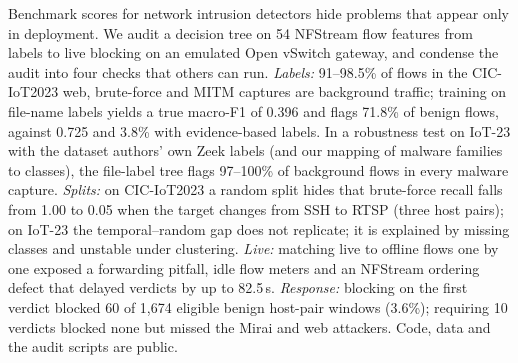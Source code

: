 Benchmark scores for network intrusion detectors hide problems that appear only in deployment. We audit a decision tree on 54 NFStream flow features from labels to live blocking on an emulated Open vSwitch gateway, and condense the audit into four checks that others can run. \emph{Labels:} 91--98.5\% of flows in the CIC-IoT2023 web, brute-force and MITM captures are background traffic; training on file-name labels yields a true macro-F1 of 0.396 and flags 71.8\% of benign flows, against 0.725 and 3.8\% with evidence-based labels. In a robustness test on IoT-23 with the dataset authors' own Zeek labels (and our mapping of malware families to classes), the file-label tree flags 97--100\% of background flows in every malware capture. \emph{Splits:} on CIC-IoT2023 a random split hides that brute-force recall falls from 1.00 to 0.05 when the target changes from SSH to RTSP (three host pairs); on IoT-23 the temporal--random gap does not replicate; it is explained by missing classes and unstable under clustering. \emph{Live:} matching live to offline flows one by one exposed a forwarding pitfall, idle flow meters and an NFStream ordering defect that delayed verdicts by up to 82.5\,s. \emph{Response:} blocking on the first verdict blocked 60 of 1,674 eligible benign host-pair windows (3.6\%); requiring 10 verdicts blocked none but missed the Mirai and web attackers. Code, data and the audit scripts are public.
